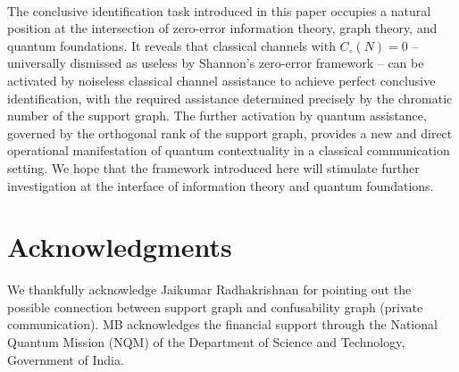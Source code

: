 \documentclass[12pt,a4paper]{article}
\begin{document}
\vspace{-.35cm}\\

\noindent The conclusive identification task introduced in this paper occupies a natural position at the intersection of zero-error information theory, graph theory, and quantum foundations. It reveals that classical channels with $C_\circ(N) = 0$ -- universally dismissed as useless by Shannon's zero-error framework -- can be activated by noiseless classical channel assistance to achieve perfect conclusive identification, with the required assistance determined precisely by the chromatic number of the support graph. The further activation by quantum assistance, governed by the orthogonal rank of the support graph, provides a new and direct operational manifestation of quantum contextuality in a classical communication setting. We hope that the framework introduced here will stimulate further investigation at the interface of information theory and quantum foundations.


\section*{Acknowledgments}
\noindent We thankfully acknowledge Jaikumar Radhakrishnan for pointing out the possible connection between support graph and confusability graph (private communication). MB acknowledges the financial support through the National Quantum Mission (NQM) of the Department of Science and Technology, Government of India. 


% 
% 
%
%
%
%
%
\end{document}
